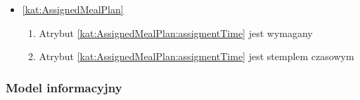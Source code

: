 \begin{itemize}[label={\textbf{Ograniczenia dla}}, wide, labelwidth=!, labelindent=0pt]
%

    \item\ref{kat:AssignedMealPlan}\mynobreakpar
    \begin{enumerate}[label={\textbf{OGR/5/\protect\twodigits{\arabic{enumi}}}}, wide, labelwidth=!, align=left, leftmargin=3cm, resume]
        \item Atrybut \ref{kat:AssignedMealPlan:assigmentTime} jest wymagany

        \item Atrybut \ref{kat:AssignedMealPlan:assigmentTime} jest stemplem czasowym
    \end{enumerate}
\end{itemize}

\subsubsection{Model informacyjny}\label{subsubsec:database:appointments:domainModel}


\thispagestyle{normal}
